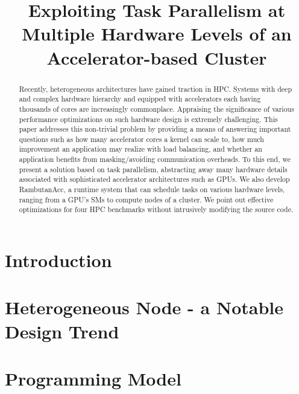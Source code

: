 \documentclass[sigconf]{acmart}
\begin{document}
\title{Exploiting Task Parallelism at Multiple Hardware Levels of an Accelerator-based Cluster}


\begin{abstract}
Recently, heterogeneous architectures have gained traction in HPC. Systems with deep and complex hardware hierarchy and equipped with accelerators each having thousands of cores are increasingly commonplace. Appraising the significance of various performance optimizations on such hardware design is extremely challenging. This paper addresses this non-trivial problem by providing a means of answering important questions such as how many accelerator cores a kernel can scale to, how much improvement an application may realize with load balancing, and whether an application benefits from masking/avoiding communication overheads. To this end, we present a solution based on task parallelism, abstracting away many hardware details associated with sophisticated accelerator architectures such as GPUs. We also develop RambutanAcc, a runtime system that can schedule tasks on various hardware levels, ranging from a GPU's SMs to compute nodes of a cluster. We point out effective optimizations for four HPC benchmarks without intrusively modifying the source code.
\end{abstract}

\maketitle

\section{Introduction}
\label{sec:intro}


\section{Heterogeneous Node - a Notable Design Trend}
\label{sec:motivation}


\section{Programming Model}
\label{sec:model}

\end{document}
